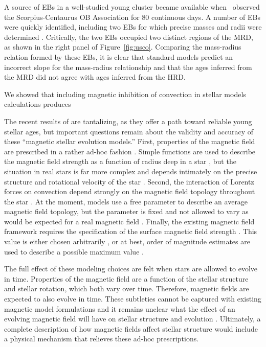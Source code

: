 A source of EBs in a well-studied young cluster became available when \kepler\ observed the Scorpius-Centaurus OB Association for 80 continuous days. A number of EBs were quickly identified, including two EBs for which precise masses and radii were determined \citep{Kraus2015, Alonso2015}. Critically, the two EBs occupied two distinct regions of the MRD, as shown in the right panel of Figure~\ref{fig:usco}. Comparing the mass-radius relation formed by these EBs, it is clear that standard models predict an incorrect slope for the mass-radius relationship and that the ages inferred from the MRD did not agree with ages inferred from the HRD.

We showed that including magnetic inhibition of convection in stellar models calculations produces 


The recent results of \citet{Feiden2016} are tantalizing, as they offer a path toward reliable young stellar ages, but important questions remain about the validity and accuracy of these ``magnetic stellar evolution models.'' First, properties of the magnetic field are prescribed in a rather ad-hoc fashion \citep{FC12b, FC13}. Simple functions are used to describe the magnetic field strength as a function of radius deep in a star \citep{FC13}, but the situation in real stars is far more complex and depends intimately on the precise structure and rotational velocity of the star \citep{Browning2008, Brown2010}. Second, the interaction of Lorentz forces on convection depend strongly on the magnetic field topology throughout the star \citep{FC13}. At the moment, models use a free parameter to describe an average magnetic field topology, but the parameter is fixed and not allowed to vary as would be expected for a real magnetic field \citep{FC12b}. Finally, the existing magnetic field framework requires the specification of the surface magnetic field strength \citep{FC12b}. This value is either chosen arbitrarily \citep{FC12b, FC13, FC14, FC14b}, or at best, order of magnitude estimates are used to describe a possible maximum value \citep{Feiden2016}. 

The full effect of these modeling choices are felt when stars are allowed to evolve in time. Properties of the magnetic field are a function of the stellar structure and stellar rotation, which both vary over time. Therefore, magnetic fields are expected to also evolve in time. These subtleties cannot be captured with existing magnetic model formulations and it remains unclear what the effect of an evolving magnetic field will have on stellar structure and evolution \citep{Feiden2016}. Ultimately, a complete description of how magnetic fields affect stellar structure would include a physical mechanism that relieves these ad-hoc prescriptions.

